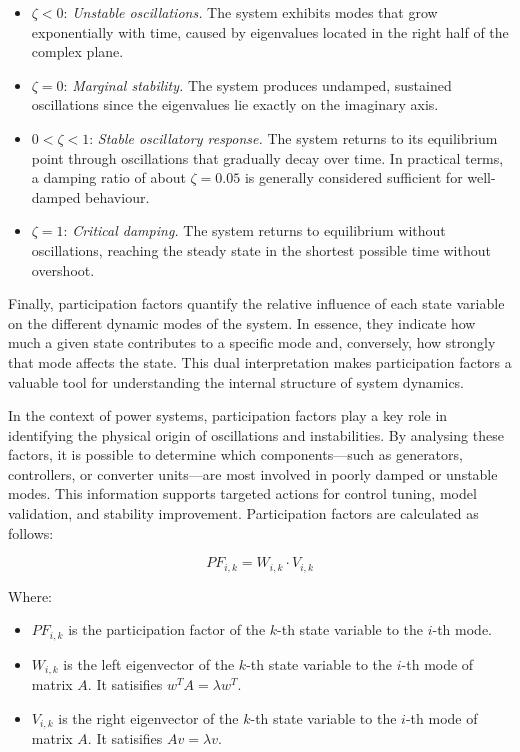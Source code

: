 \begin{itemize}
  \item $\zeta < 0$: \textit{Unstable oscillations.} The system exhibits modes that grow exponentially with time, caused by eigenvalues located in the right half of the complex plane.
  \item $\zeta = 0$: \textit{Marginal stability.} The system produces undamped, sustained oscillations since the eigenvalues lie exactly on the imaginary axis.
  \item $0 < \zeta < 1$: \textit{Stable oscillatory response.} The system returns to its equilibrium point through oscillations that gradually decay over time. In practical terms, a damping ratio of about $\zeta = 0.05$ is generally considered sufficient for well-damped behaviour.
  \item $\zeta = 1$: \textit{Critical damping.} The system returns to equilibrium without oscillations, reaching the steady state in the shortest possible time without overshoot.
\end{itemize}

Finally, participation factors quantify the relative influence of each state variable on the different dynamic modes of the system. In essence,
they indicate how much a given state contributes to a specific mode and, conversely, how strongly that mode affects the state.
This dual interpretation makes participation factors a valuable tool for understanding the internal structure of system dynamics.

In the context of power systems, participation factors play a key role in identifying the physical origin of oscillations and instabilities.
By analysing these factors, it is possible to determine which components—such as generators, controllers, or converter units—are most involved in poorly damped or unstable modes.
This information supports targeted actions for control tuning, model validation, and stability improvement. Participation factors are calculated as follows:

\begin{equation}
PF_{i,k} = W_{i,k} \cdot V_{i,k}
\end{equation}

Where:
\begin{itemize}
  \item $PF_{i,k}$ is the participation factor of the $k$-th state variable to the $i$-th mode.
  \item $W_{i,k}$ is the left eigenvector of the $k$-th state variable to the $i$-th mode of matrix $A$. It satisifies $w^T A = \lambda w^T$.
  \item $V_{i,k}$ is the right eigenvector of the $k$-th state variable to the $i$-th mode of matrix $A$. It satisifies $A v= \lambda v$.
\end{itemize}

